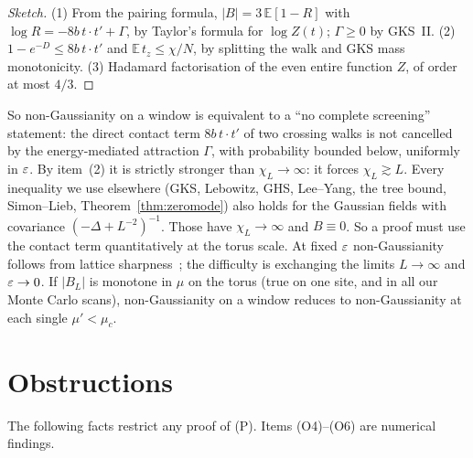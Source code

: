 \begin{proof}[Sketch]
(1) From the pairing formula, $|B|=3\,\mathbb E[1-R]$ with $\log R=-8b\,t\cdot t'+\Gamma$, by Taylor's formula for $\log Z(t)$; $\Gamma\ge0$ by GKS~II. (2) $1-e^{-D}\le8b\,t\cdot t'$ and $\mathbb E\,t_z\le\chi/N$, by splitting the walk and GKS mass monotonicity. (3) Hadamard factorisation of the even entire function $Z$, of order at most $4/3$.
\end{proof}

So non-Gaussianity on a window is equivalent to a ``no complete screening'' statement: the direct contact term $8b\,t\cdot t'$ of two crossing walks is not cancelled by the energy-mediated attraction $\Gamma$, with probability bounded below, uniformly in $\varepsilon$. By item~(2) it is strictly stronger than $\chi_L\to\infty$: it forces $\chi_L\gtrsim L$. Every inequality we use elsewhere (GKS, Lebowitz, GHS, Lee--Yang, the tree bound, Simon--Lieb, Theorem~\ref{thm:zeromode}) also holds for the Gaussian fields with covariance $(-\Delta+L^{-2})^{-1}$. Those have $\chi_L\to\infty$ and $B\equiv0$. So a proof must use the contact term quantitatively at the torus scale. At fixed $\varepsilon$ non-Gaussianity follows from lattice sharpness~\cite{ABF87,GPPS22}; the difficulty is exchanging the limits $L\to\infty$ and $\varepsilon\to0$. If $|B_L|$ is monotone in $\mu$ on the torus (true on one site, and in all our Monte Carlo scans), non-Gaussianity on a window reduces to non-Gaussianity at each single $\mu'<\mu_c$.

\section{Obstructions}\label{sec:obstructions}

The following facts restrict any proof of (P). Items (O4)--(O6) are numerical findings.

